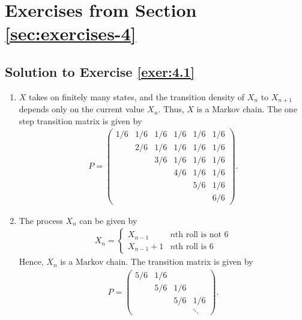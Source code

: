 \documentclass[12pt]{book}
\numberwithin{equation}{chapter}
\theoremstyle{plain}
\numberwithin{theorem}{section}
\theoremstyle{definition}
\numberwithin{exercise}{chapter}
\newcommand{\<}{\langle}
\renewcommand{\>}{\rangle}
\renewcommand{\(}{\left(}
\renewcommand{\)}{\right)}
\renewcommand{\[}{\left[}
\renewcommand{\]}{\right]}
\begin{document}

\section{Exercises from Section \ref{sec:exercises-4}}

\subsection*{Solution to Exercise \ref{exer:4.1}}
\begin{enumerate}
	\item[(a.)] $X$ takes on finitely many states, and the transition density of $X_n$ to $X_{n+1}$ depends only on 
the current value $X_n$. Thus, $X$ is a Markov chain. The one step transition matrix is given by
\begin{align}
P = 
\begin{pmatrix}
1/6 & 1/6 & 1/6 & 1/6 & 1/6 & 1/6 \\
   & 2/6 & 1/6 & 1/6 & 1/6 & 1/6 \\
   &    & 3/6 & 1/6 & 1/6 & 1/6 \\
   &    &    & 4/6 & 1/6 & 1/6 \\
   &    &    &    & 5/6 & 1/6 \\
   &    &    &    &    & 6/6 
\end{pmatrix}.
\end{align}
\item[(b.)] The process $X_n$ can be given by 
	\begin{align}
	X_{n} 
		= \left\{
		\begin{array}{lr}
		X_{n-1}& n\text{th roll is not 6} \\
		X_{n-1} +1 & n\text{th roll is 6}
		\end{array}
		\right.
	\end{align}
	Hence, $X_n$ is a Markov chain. The transition matrix is given by
	\begin{align}
	P =
	\begin{pmatrix}
	5/6 & 1/6 \\
	    & 5/6 & 1/6 \\
	    &     & 5/6 & 1/6 \\
	    &     &     &  \ddots
	\end{pmatrix}.

\end{align}
\end{enumerate}
\end{document}
